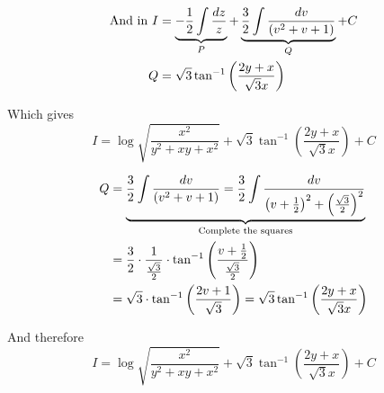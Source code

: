 \documentclass[14pt,fleqn]{extarticle}
\begin{document}
\newcard 

\begin{align}
\text{And in }I &= \underbrace{-\frac{1}{2}\int \frac{dz}{z}}_P + \underbrace{\frac{3}{2}\int \frac{dv}{\left(v^2 + v + 1\right)}}_Q + C \\
Q &= \sqrt{3}\tan^{-1} \left(\frac{2y+x}{\sqrt{3} x } \right)
\end{align}

Which gives 
\small\[ I = \log \sqrt{\frac{x^2}{y^2+xy+x^2}} + \sqrt{3}\tan^{-1} \left(\frac{2y+x}{\sqrt{3} x } \right) + C\]\normalsize

\newcard 

\begin{align}
Q &= \underbrace{\frac{3}{2}\int \frac{dv}{\left(v^2 + v + 1\right)} = \frac{3}{2}\int \frac{dv}{\left(v + \frac{1}{2} \right)^2 + \left( \frac{\sqrt{3}}{2}\right)^2}}_{\text{Complete the squares}} \\
&= \frac{3}{2}\cdot \frac{1}{\frac{\sqrt{3}}{2}}\cdot\tan^{-1} \left(\frac{v+\frac{1}{2}}{\frac{\sqrt{3}}{2}} \right) \\
&= \sqrt{3}\cdot\tan^{-1} \left(\frac{2v+1}{\sqrt{3}} \right) = 
\sqrt{3}\tan^{-1} \left(\frac{2y+x}{\sqrt{3} x } \right)
\end{align}

And therefore 
\small\[ I = \log \sqrt{\frac{x^2}{y^2+xy+x^2}} + \sqrt{3}\tan^{-1} \left(\frac{2y+x}{\sqrt{3} x } \right) + C \]\normalsize
\end{document}
